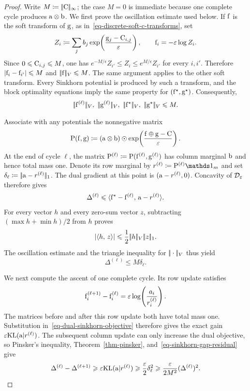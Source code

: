 \begin{proof}
	Write $M\coloneqq|\!| \mathrm{C} |\!|_\infty$; the case $M=0$ is immediate because one complete cycle produces $\mathrm{a}\otimes\mathrm{b}$. We first prove the oscillation estimate used below. If $\mathrm{f}$ is the soft transform of $\mathrm{g}$, as in~\eqref{eq-discrete-soft-c-transforms}, set
	\[
		Z_i\coloneqq\sum_j b_j\exp\!\left(\frac{\mathrm{g}_j-\mathrm{C}_{i,j}}{\varepsilon}\right),
		\qquad \mathrm{f}_i=-\varepsilon\log Z_i.
	\]
	Since $0\leqslant \mathrm{C}_{i,j}\leqslant M$, one has $e^{-M/\epsilon}Z_{i'}\leq Z_i\leq e^{M/\epsilon}Z_{i'}$ for every $i,i'$. Therefore $\left\lvert\mathrm{f}_i-\mathrm{f}_{i'}\right\rvert\leqslant M$ and $|\!| \mathrm{f} |\!|_V\leqslant M$. The same argument applies to the other soft transform. Every Sinkhorn potential is produced by such a transform, and the block optimality equations imply the same property for $(\mathrm{f}^\star,\mathrm{g}^\star)$. Consequently,
	\[
		\norm{\fD^{(\ell)}}_V,\ \norm{\gD^{(\ell)}}_V,
		\ \norm{\fD^\star}_V,\ \norm{\gD^\star}_V
		\leq M.
	\]

	Associate with any potentials the nonnegative matrix
	\[
		\mathrm{P}(\mathrm{f},\mathrm{g})
		\coloneqq
		(\mathrm{a}\otimes\mathrm{b})
		\odot
		\exp\!\left(\frac{\mathrm{f}\oplus\mathrm{g}-\mathrm{C}}{\varepsilon}\right).
	\]
	At the end of cycle $\ell$, the matrix $\mathrm{P}^{(\ell)}\coloneqq\mathrm{P}(\mathrm{f}^{(\ell)},\mathrm{g}^{(\ell)})$ has column marginal $\mathrm{b}$ and hence total mass one. Denote its row marginal by $r^{(\ell)}\eqdef\P^{(\ell)}\ones_m$ and set $\delta_\ell\coloneqq|\!| \mathrm{a}-r^{(\ell)} |\!|_1$. The dual gradient at this point is $(\mathrm{a}-r^{(\ell)},0)$. Concavity of $\mathcal{D}_\varepsilon$ therefore gives
	\[
		\Delta^{(\ell)}
		\leqslant
		\langle \mathrm{f}^\star-\mathrm{f}^{(\ell)},\,\mathrm{a}-r^{(\ell)}\rangle.
	\]
	For every vector $h$ and every zero-sum vector $z$, subtracting $(\max h+\min h)/2$ from $h$ proves
	\[
		\left\lvert\langle h,\,z\rangle\right\rvert
		\leqslant
		\frac12|\!| h |\!|_V|\!| z |\!|_1.
	\]
	The oscillation estimate and the triangle inequality for $|\!| \cdot |\!|_V$ thus yield
	\begin{equation}\label{eq-sinkhorn-gap-residual}
		\Delta^{(\ell)}\leq M\delta_\ell.
	\end{equation}

	We next compute the ascent of one complete cycle. Its row update satisfies
	\[
		\mathrm{f}_i^{(\ell+1)}-\mathrm{f}_i^{(\ell)}
		=
		\varepsilon\log\!\left(\frac{a_i}{r_i^{(\ell)}}\right).
	\]
	The matrices before and after this row update both have total mass one. Substitution in~\eqref{eq-dual-sinkhorn-objective} therefore gives the exact gain $\varepsilon\mathrm{KL}(\mathrm{a}|r^{(\ell)})$. The subsequent column update can only increase the dual objective, so Pinsker's inequality, Theorem~\ref{thm-pinsker}, and~\eqref{eq-sinkhorn-gap-residual} give
	\[
		\Delta^{(\ell)}-\Delta^{(\ell+1)}
		\geqslant
		\varepsilon\mathrm{KL}(\mathrm{a}|r^{(\ell)})
		\geqslant
		\frac{\varepsilon}{2}\delta_\ell^2
		\geqslant
		\frac{\varepsilon}{2M^2}(\Delta^{(\ell)})^2.
	\]


\end{proof}
